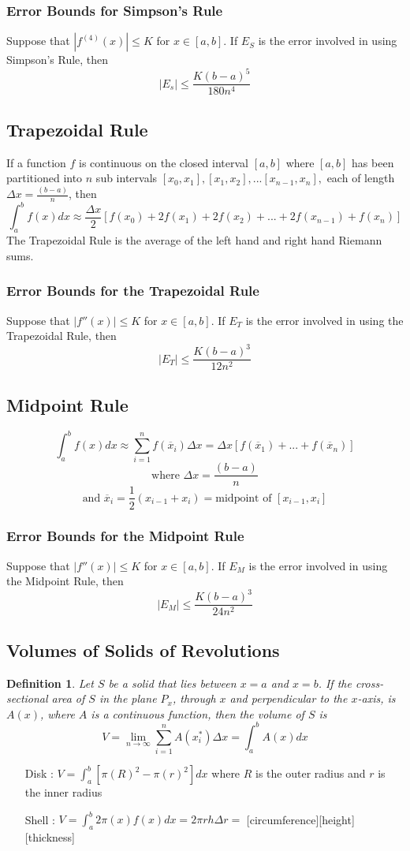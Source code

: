 \documentclass[10pt]{report}
\newtheorem{def3}{Definition}[subsection]
\begin{document}
\subsubsection{Error Bounds for Simpson's Rule}
Suppose that $|f^{(4)}(x)|\leq K$ for $x\in [a,b]$. If $E_S$ is the error involved in using Simpson's Rule, then
$$|E_s| \leq \frac{K(b-a)^5}{180n^4}$$
\subsection{Trapezoidal Rule}
If a function $f$ is continuous on the closed interval $[a,b]$ where $[a,b]$ has been partitioned into $n$ sub intervals $[x_0,x_1],[x_1,x_2],...[x_{n-1},x_n],$ each of length $\Delta x = \frac{(b-a)}{n}$, then $$\int_a^bf(x)dx\approx \frac{\Delta x}{2}[f(x_0) + 2f(x_1) + 2f(x_2) + ... + 2f(x_{n-1}) + f(x_n)]$$
The Trapezoidal Rule is the average of the left hand and right hand Riemann sums.
\subsubsection{Error Bounds for the Trapezoidal Rule}
Suppose that $|f''(x)|\leq K$ for $x\in [a,b]$. If $E_T$ is the error involved in using the Trapezoidal Rule, then
$$|E_T| \leq \frac{K(b-a)^3}{12n^2}$$
\subsection{Midpoint Rule}
$$\int_a^bf(x)dx\approx \sum_{i=1}^n f(\overline{x}_i)\Delta x=\Delta x [f(\overline{x}_1)+ ...+ f(\overline{x}_n)]$$
$$\text{where  } \Delta x =\frac{(b-a)}{n}$$
$$\text{and  } \overline{x}_i= \frac{1}{2}(x_{i-1}+x_i)=\text{midpoint of  } [x_{i-1},x_i]$$
\subsubsection{Error Bounds for the Midpoint Rule}
Suppose that $|f''(x)|\leq K$ for $x\in [a,b]$. If $E_M$ is the error involved in using the Midpoint Rule, then
$$|E_M| \leq \frac{K(b-a)^3}{24n^2}$$

\subsection{Volumes of Solids of Revolutions}
\begin{def3}
Let $S$ be a solid that lies between $x=a$ and $x=b$. If the cross-sectional area of $S$ in the plane $P_x$, through $x$ and perpendicular to the $x$-axis, is $A(x)$, where $A$ is a continuous function, then the volume of $S$ is
$$V=\lim_{n\to\infty} \sum_{i=1}^n A (x_i^*)\Delta x = \int_a^bA(x)dx$$
\end{def3}
\begin{itemize}
\item[Disk]: $V=\int_a^b [\pi(R)^2-\pi(r)^2]dx$ where $R$ is the outer radius and $r$ is the inner radius
\item[Shell]: $V=\int_a^b 2\pi(x)f(x)dx = 2\pi r h \Delta r =$ [circumference][height][thickness] 
\end{itemize}
\end{document}
